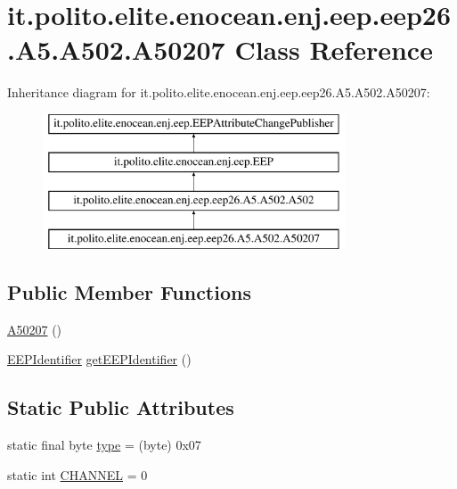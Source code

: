 \hypertarget{classit_1_1polito_1_1elite_1_1enocean_1_1enj_1_1eep_1_1eep26_1_1_a5_1_1_a502_1_1_a50207}{}\section{it.\+polito.\+elite.\+enocean.\+enj.\+eep.\+eep26.\+A5.\+A502.\+A50207 Class Reference}
\label{classit_1_1polito_1_1elite_1_1enocean_1_1enj_1_1eep_1_1eep26_1_1_a5_1_1_a502_1_1_a50207}
Inheritance diagram for it.\+polito.\+elite.\+enocean.\+enj.\+eep.\+eep26.\+A5.\+A502.\+A50207\+:\begin{figure}[H]
\begin{center}
\leavevmode
\includegraphics[height=4.000000cm]{classit_1_1polito_1_1elite_1_1enocean_1_1enj_1_1eep_1_1eep26_1_1_a5_1_1_a502_1_1_a50207}
\end{center}
\end{figure}
\subsection*{Public Member Functions}
\begin{DoxyCompactItemize}
\item 
\hyperlink{classit_1_1polito_1_1elite_1_1enocean_1_1enj_1_1eep_1_1eep26_1_1_a5_1_1_a502_1_1_a50207_a81ae948af52aea3d3c0c4cf952fd7971}{A50207} ()
\item 
\hyperlink{classit_1_1polito_1_1elite_1_1enocean_1_1enj_1_1eep_1_1_e_e_p_identifier}{E\+E\+P\+Identifier} \hyperlink{classit_1_1polito_1_1elite_1_1enocean_1_1enj_1_1eep_1_1eep26_1_1_a5_1_1_a502_1_1_a50207_a57c05194484e53d1a715a5b7a89389e2}{get\+E\+E\+P\+Identifier} ()
\end{DoxyCompactItemize}
\subsection*{Static Public Attributes}
\begin{DoxyCompactItemize}
\item 
static final byte \hyperlink{classit_1_1polito_1_1elite_1_1enocean_1_1enj_1_1eep_1_1eep26_1_1_a5_1_1_a502_1_1_a50207_a2b1bb51cfcf21774079c6ea4190d9f02}{type} = (byte) 0x07
\item 
static int \hyperlink{classit_1_1polito_1_1elite_1_1enocean_1_1enj_1_1eep_1_1eep26_1_1_a5_1_1_a502_1_1_a50207_a04f430ff68a7ec34daf67ad6452d26f4}{C\+H\+A\+N\+N\+EL} = 0
\end{DoxyCompactItemize}
